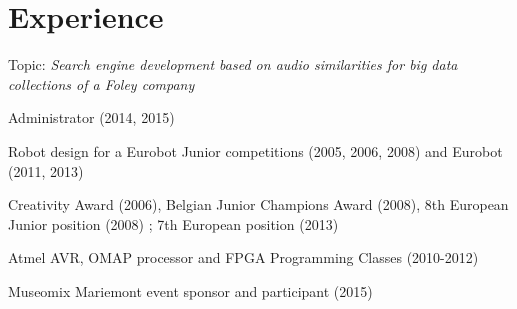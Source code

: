 \documentclass[a4paper]{deedy-resume} %
\begin{document}

\lastupdated %

\sectionspace %
\vspace{35pt}

\section{Experience}
\vspace{5pt}
Topic: \textit{Search engine development based on audio similarities for big data collections of a Foley company}\\

\vspace{15pt}

\begin{tightitemize}
	\item Administrator (2014, 2015)
	\item Robot design for a Eurobot Junior competitions (2005, 2006, 2008) and Eurobot (2011, 2013)
	\item Creativity Award (2006), Belgian Junior Champions Award (2008), 8th European Junior position (2008) ; 7th European position (2013)
	\item Atmel AVR, OMAP processor and FPGA Programming Classes (2010-2012)
	\item Museomix Mariemont event sponsor and participant (2015)
\end{tightitemize}
\end{document}
